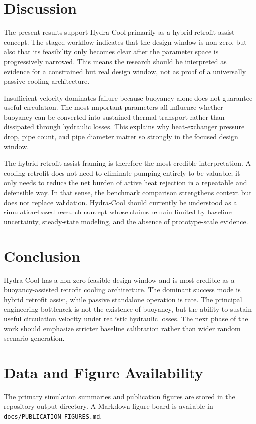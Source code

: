 \documentclass[11pt]{article}
\begin{document}
\section{Discussion}

The present results support Hydra-Cool primarily as a hybrid retrofit-assist concept. The staged workflow indicates that the design window is non-zero, but also that its feasibility only becomes clear after the parameter space is progressively narrowed. This means the research should be interpreted as evidence for a constrained but real design window, not as proof of a universally passive cooling architecture.

Insufficient velocity dominates failure because buoyancy alone does not guarantee useful circulation. The most important parameters all influence whether buoyancy can be converted into sustained thermal transport rather than dissipated through hydraulic losses. This explains why heat-exchanger pressure drop, pipe count, and pipe diameter matter so strongly in the focused design window.

The hybrid retrofit-assist framing is therefore the most credible interpretation. A cooling retrofit does not need to eliminate pumping entirely to be valuable; it only needs to reduce the net burden of active heat rejection in a repeatable and defensible way. In that sense, the benchmark comparison strengthens context but does not replace validation. Hydra-Cool should currently be understood as a simulation-based research concept whose claims remain limited by baseline uncertainty, steady-state modeling, and the absence of prototype-scale evidence.

\section{Conclusion}

Hydra-Cool has a non-zero feasible design window and is most credible as a buoyancy-assisted retrofit cooling architecture. The dominant success mode is hybrid retrofit assist, while passive standalone operation is rare. The principal engineering bottleneck is not the existence of buoyancy, but the ability to sustain useful circulation velocity under realistic hydraulic losses. The next phase of the work should emphasize stricter baseline calibration rather than wider random scenario generation.

\section*{Data and Figure Availability}

The primary simulation summaries and publication figures are stored in the repository output directory. A Markdown figure board is available in \texttt{docs/PUBLICATION\_FIGURES.md}.



\end{document}
